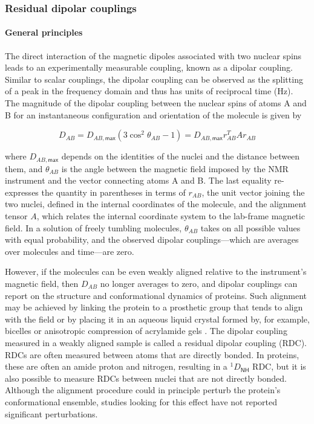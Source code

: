 \documentclass[9pt,review]{livecoms}
\begin{document}
\subsubsection{Residual dipolar couplings}

\paragraph{General principles}

The direct interaction of the magnetic dipoles associated with two nuclear spins leads to an experimentally measurable coupling, known as a dipolar coupling.
Similar to scalar couplings, the dipolar coupling can be observed as the splitting of a peak in the frequency domain and thus has units of reciprocal time (Hz).
The magnitude of the dipolar coupling between the nuclear spins of atoms A and B for an instantaneous configuration and orientation of the molecule is given by

\begin{equation}
\label{eqn:rdc}
D_{AB} = D_{AB,\mathsf{max}} \left( 3 \cos^2 \theta_{AB} - 1 \right) = D_{AB,\mathsf{max}} r_{AB}^T A r_{AB}
\end{equation}

\noindent where $D_{AB,\mathsf{max}}$ depends on the identities of the nuclei and the distance between them, and $\theta_{AB}$ is the angle between the magnetic field imposed by the NMR instrument and the vector connecting atoms A and B.
The last equality re-expresses the quantity in parentheses in terms of $r_{AB}$, the unit vector joining the two nuclei, defined in the internal coordinates of the molecule, and the alignment tensor $A$, which relates the internal coordinate system to the lab-frame magnetic field.
In a solution of freely tumbling molecules, $\theta_{AB}$ takes on all possible values with equal probability, and the observed dipolar couplings---which are averages over molecules and time---are zero.

However, if the molecules can be even weakly aligned relative to the instrument’s magnetic field, then $D_{AB}$ no longer averages to zero, and dipolar couplings can report on the structure and conformational dynamics of proteins.
Such alignment may be achieved by linking the protein to a prosthetic group that tends to align with the field or by placing it in an aqueous liquid crystal formed by, for example, bicelles \cite{sanders_magnetically_1990,prosser_magnetically_1998} or anisotropic compression of acrylamide gels \cite{tycko_alignment_2000}.
The dipolar coupling measured in a weakly aligned sample is called a residual dipolar coupling (RDC).
RDCs are often measured between atoms that are directly bonded.
In proteins, these are often an amide proton and nitrogen, resulting in a $^1D_{\mathsf{NH}}$ RDC, but it is also possible to measure RDCs between nuclei that are not directly bonded.
Although the alignment procedure could in principle perturb the protein’s conformational ensemble, studies looking for this effect have not reported significant perturbations.
\end{document}
